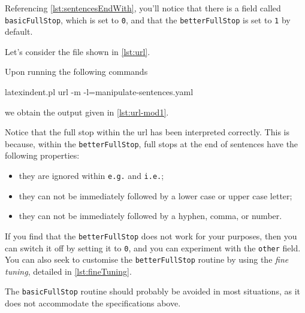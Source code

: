 \documentclass[10pt]{article}
\begin{document}
 Referencing \vref{lst:sentencesEndWith}, you'll notice that there is a field called
 \texttt{basicFullStop}, which is set to \texttt{0}, and that the \texttt{betterFullStop}
 is set to \texttt{1} by default.

 \begin{example}
 Let's consider the file shown in \cref{lst:url}.


 Upon running the following commands  

 \begin{commandshell}
latexindent.pl url -m -l=manipulate-sentences.yaml
\end{commandshell}

 we obtain the output given in \cref{lst:url-mod1}.


 Notice that the full stop within the url has been interpreted correctly. This is
 because, within the \texttt{betterFullStop}, full stops at the end of sentences have the
 following properties:
 \begin{itemize}
  \item they are ignored within \texttt{e.g.} and \texttt{i.e.};
  \item they can not be immediately followed by a lower case or upper case letter;
  \item they can not be immediately followed by a hyphen, comma, or number.
 \end{itemize}
 \end{example}

 If you find that the \texttt{betterFullStop} does not work for your purposes, then you
 can switch it off by setting it to \texttt{0}, and you can experiment with the
 \texttt{other} field.  You can also
 seek to customise the \texttt{betterFullStop} routine by using the \emph{fine tuning},
 detailed in \vref{lst:fineTuning}.%

 The \texttt{basicFullStop} routine should probably be avoided in most situations, as it
 does not accommodate the specifications above.
\end{document}
